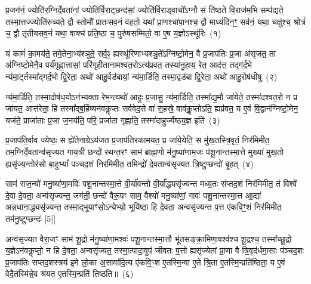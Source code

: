 \setcounter{anuvakam}{0}
प्र॒जन॑नं॒ ज्योति॑र॒ग्निर्दे॒वता॑नां॒ ज्योति॑र्वि॒राट्छन्द॑सां॒ ज्योति॑र्वि॒राड्वा॒चो᳚\-ऽग्नौ सं ति॑ष्ठते वि॒राज॑म॒भि सम्प॑द्यते॒ तस्मा॒\-त्तज्ज्योति॑रुच्यते॒ द्वौ स्तोमौ᳚ प्रातःसव॒नं व॑हतो॒ यथा᳚ प्रा॒णश्चा॑पा॒नश्च॒ द्वौ माध्यं॑दिन॒ꣳ॒ सव॑नं॒ यथा॒ चक्षु॑श्च॒ श्रोत्रं॑ च॒ द्वौ तृ॑तीयसव॒नं यथा॒ वाक्च॑ प्रति॒ष्ठा च॒ पुरु॑षसम्मितो॒ वा ए॒ष य॒ज्ञो\-ऽस्थू॑रिः~(१)

यं कामं॑ का॒मय॑ते॒ तमे॒तेना॒भ्य॑श्ञुते॒ सर्व॒ꣴ॒ ह्यस्थू॑रिणाभ्यश्ञु॒ते᳚\-ऽग्निष्टो॒मेन॒ वै प्र॒जा\-प॑तिः प्र॒जा अ॑सृजत॒ ता अ॑ग्निष्टो॒मेनै॒व पर्य॑गृह्णा॒त्तासां॒ परि॑गृहीतानामश्वत॒रो\-ऽत्य॑प्रवत॒ तस्या॑नु॒हाय॒ रेत॒ आद॑त्त॒ तद्ग॑र्द॒भे न्य॑मा॒र्ट्तस्मा᳚द्गर्द॒भो द्वि॒रेता॒ अथो॑ आहु॒र्वड॑बायां॒ न्य॑मा॒र्डिति॒ तस्मा॒द्वड॑बा द्वि॒रेता॒ अथो॑ आहु॒रोष॑धीषु~(२)

न्य॑मा॒र्डिति॒ तस्मा॒दोष॑ध॒यो\-ऽन॑भ्यक्ता रेभ॒न्त्यथो॑ आहुः प्र॒जासु॒ न्य॑मा॒र्डिति॒ तस्मा᳚द्य॒मौ जा॑येते॒ तस्मा॑दश्वत॒रो न प्र जा॑यत॒ आत्त॑रेता॒ हि तस्मा᳚द्ब॒र्\mbox{}हिष्यन॑वकॢप्तः सर्ववेद॒से वा॑ स॒हस्रे॒ वाव॑कॢ॒प्तो\-ऽति॒ ह्यप्र॑वत॒ य ए॒वं वि॒द्वान॑ग्निष्टो॒मेन॒ यज॑ते॒ प्राजा॑ताः प्र॒जा ज॒नय॑ति॒ परि॒ प्रजा॑ता गृह्णाति॒ तस्मा॑दाहुर्ज्येष्ठय॒ज्ञ इति॑~(३)

प्र॒जा\-प॑ति॒र्वाव ज्येष्ठः॒ स ह्ये॑तेनाग्रे\-ऽय॑जत प्र॒जा\-प॑तिरकामयत॒ प्र जा॑ये॒येति॒ स मु॑ख॒तस्त्रि॒वृतं॒ निर॑मिमीत॒ तम॒ग्नि\-र्दे॒वतान्व॑सृज्यत गाय॒त्री छन्दो॑ रथन्त॒रꣳ साम॑ ब्राह्म॒णो म॑नु॒ष्या॑णाम॒जः प॑शू॒नान्तस्मा॒त्ते मुख्या॑ मुख॒तो ह्यसृ॑ज्य॒न्तोर॑सो बा॒हु\-भ्यां᳚ पञ्चद॒शं निर॑मिमीत॒ तमिन्द्रो॑ दे॒वतान्व॑सृज्यत त्रि॒ष्टुप्छन्दो॑ बृ॒हत्~(४)

साम॑ राज॒न्यो॑ मनु॒ष्या॑णा॒मविः॑ पशू॒नान्तस्मा॒त्ते वी॒र्या॑वन्तो वी॒र्या᳚द्ध्यसृ॑ज्यन्त मध्य॒तः स॑प्तद॒शं निर॑मिमीत॒ तं विश्वे॑ दे॒वा दे॒वता॒ अन्व॑सृज्यन्त॒ जग॑ती॒ छन्दो॑ वैरू॒पꣳ साम॒ वैश्यो॑ मनु॒ष्या॑णां॒ गावः॑ पशू॒नान्तस्मा॒त्त आ॒द्या॑ अन्न॒धाना॒\-द्ध्यसृ॑ज्यन्त॒ तस्मा॒द्भूयाꣳ॑सो॒\-ऽन्येभ्यो॒ भूयि॑ष्ठा॒ हि दे॒वता॒ अन्वसृ॑ज्यन्त प॒त्त ए॑कवि॒ꣳ॒शं निर॑मिमीत॒ तम॑नु॒ष्टुप्छन्दः॑ [5[]

अन्व॑सृज्यत वैरा॒जꣳ साम॑ शू॒द्रो म॑नु॒ष्या॑णा॒मश्वः॑ पशू॒नान्तस्मा॒त्तौ भू॑तसङ्क्रा॒मिणा॒वश्व॑श्च शू॒द्रश्च॒ तस्मा᳚च्छू॒द्रो य॒ज्ञे\-ऽन॑वकॢप्तो॒ न हि दे॒वता॒ अन्वसृ॑ज्यत॒ तस्मा॒त्पादा॒वुप॑ जीवतः प॒त्तो ह्यसृ॑ज्येतां प्रा॒णा वै त्रि॒वृद॑र्धमा॒साः प॑ञ्चद॒शः प्र॒जा\-प॑तिः सप्तद॒शस्त्रय॑ इ॒मे लो॒का अ॒सावा॑दि॒त्य ए॑कवि॒ꣳ॒श ए॒तस्मि॒न्वा ए॒ते श्रि॒ता ए॒तस्मि॒न्प्रति॑ष्ठिता॒ य ए॒वं वेदै॒तस्मि॑न्ने॒व श्र॑यत ए॒तस्मि॒न्प्रति॑ तिष्ठति॥~(६)


